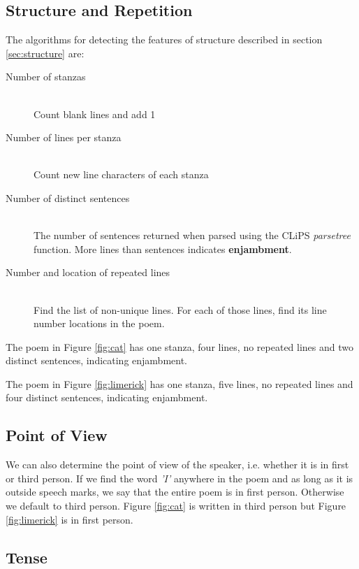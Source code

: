 \subsection{Structure and Repetition}

The algorithms for detecting the features of structure described in section \ref{sec:structure} are:

\begin{description}
\item[Number of stanzas] \hfill \\
Count blank lines and add 1
\item[Number of lines per stanza] \hfill \\
Count new line characters of each stanza
\item[Number of distinct sentences] \hfill \\
The number of sentences returned when parsed using the CLiPS\cite{de2012pattern} \textit{parsetree} function. 
More lines than sentences indicates \textbf{enjambment}.
\item[Number and location of repeated lines] \hfill \\
Find the list of non-unique lines. For each of those lines, find its line number locations in the poem.

\end{description}

The poem in Figure \ref{fig:cat} has one stanza, four lines, no repeated lines and two distinct sentences, indicating enjambment.

The poem in Figure \ref{fig:limerick} has one stanza, five lines, no repeated lines and four distinct sentences, indicating enjambment.

\subsection{Point of View}

We can also determine the point of view of the speaker, i.e. whether it is in first or third person. If we find the word \textit{'I'} anywhere in the poem and as long as it is outside speech marks, we say that the entire poem is in first person. Otherwise we default to third person. Figure \ref{fig:cat} is written in third person but Figure \ref{fig:limerick} is in first person.

\subsection{Tense}


